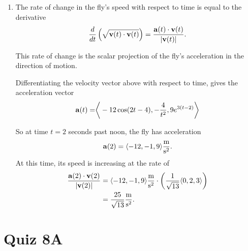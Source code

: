 \documentclass{ximera}
\begin{document}
\begin{question}
\begin{explanation}
\begin{enumerate}
At time $t=2$, the fly has position
\[
 {\bf p}(2) = \langle 3, 0, 1\rangle \text{ meters}
\]
relative to the origin and position
\[
    \langle 3, 0, 1\rangle \text{ m} - \langle 1,2,4\rangle \text{ m}  = \langle 2, -2, -3 \rangle \text{ m}
\]
relative to $(1,2,4)$ .

So at time $t=2$ seconds past noon, the distance between the fly and the point $(1,2,4)$ is changing at the rate of
\begin{align*}
     \langle 0,2,3 \rangle \text{ m/s} \cdot \left(\frac{1}{\sqrt{17}}\langle 2,-2,-3\rangle\right)   = -\frac{13}{\sqrt{17}} \text{ m/s} .
\end{align*}
So at time $t=2$ the distance between the fly and the point $(1,2,4)$ is decreasing at the rate of 
\[
 \frac{13}{\sqrt{17}} \text{ m/s} .
\]


\item The rate of change in the fly's speed with respect to time is equal to the derivative
\begin{align*}
   \frac{d}{dt}\left( \sqrt{{\bf v}(t)\cdot {\bf v}(t)} \right) = \frac{{\bf a}(t)\cdot {\bf v}(t)}{|{\bf v}(t)|} .
\end{align*}

This rate of change is the scalar projection of the fly's acceleration in the direction of motion.

Differentiating the velocity vector above with respect to time, gives the acceleration vector 
\[
    {\bf a}(t) = \biggr \langle -12 \cos(2t-4) , -\frac{4}{t^2} , 9e^{3(t-2)} \biggr \rangle 
\]

So at time $t=2$ seconds past noon, the fly has acceleration
\[
  {\bf a}(2) = \langle -12, -1, 9 \rangle \frac{\text{m}}{\text{s}^2} . 
\]
At this time, its speed is increasing at the rate of
\begin{align*}
   \frac{{\bf a}(2)\cdot {\bf v}(2)}{|{\bf v}(2)|} &= \langle -12, -1, 9 \rangle \frac{\text{m}}{\text{s}^2} \cdot \left(\frac{1}{\sqrt{13}}\langle 0,2,3\rangle\right) \\
         & = \frac{25}{\sqrt{13}} \frac{\text{m}}{\text{s}^2} .
\end{align*}

\end{enumerate}
\end{explanation}
\end{question}

\section{Quiz 8A}
\end{document}
